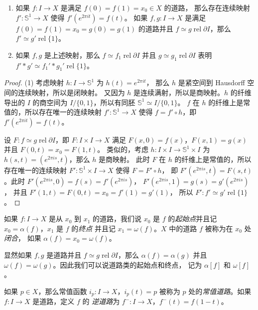 \documentclass[fontset=none]{Notes}
\DeclareMathOperator\rel{rel}
\newcommand{\partI}{\partial I}
\newcommand{\relhomo}{\rel\partI}
\begin{document}
\begin{problem}{}{}
  \begin{enumerate}
    \item 如果 $f:I\to X$ 是满足 $f(0)=f(1)=x_0\in X$ 的道路，
    那么存在连续映射 $f':\mathbb{S}^1\to X$ 使得 $f'(e^{2\pi it})=f(t)$。
    如果 $f,g:I\to X$ 是满足 $f(0)=f(1)=x_0=g(0)=g(1)$ 的道路并且
    $f\simeq g\relhomo$，那么 $f'\simeq g'\rel\{1\}$。
    \item 如果 $f,g$ 是上述映射，那么 $f\simeq f_1\relhomo$
    并且 $g\simeq g_1\relhomo$ 表明 $f'*g'\simeq f_1'*g_1'\rel\{1\}$。
  \end{enumerate}
\end{problem}
\begin{proof}
  (1) 考虑映射 $h:I\to \mathbb{S}^1$ 为 $h(t)=e^{2\pi it}$，
  那么 $h$ 是紧空间到 Hausdorff 空间的连续映射，所以是闭映射。
  又因为 $h$ 是连续满射，所以是商映射。$h$ 的纤维导出的 $I$
  的商空间为 $I/\{0,1\}$，所以有同胚 $\mathbb{S}^1\simeq I/\{0,1\}$。
  $f$ 在 $h$ 的纤维上是常值的，所以存在唯一的连续映射 $f':\mathbb{S}^1\to X$
  使得 $f=f'\circ h$，即 $f'(e^{2\pi i t})=f(t)$。

  设 $F:f\simeq g\relhomo$，即 $F:I\times I\to X$ 满足
  $F(x,0)=f(x)$，$F(x,1)=g(x)$ 并且 $F(0,t)=x_0=F(1,t)$。
  类似的，考虑 $h:I\times I\to \mathbb{S}^1\times I$ 为
  $h(s,t)=(e^{2\pi i s},t)$，那么 $h$ 是商映射。
  此时 $F$ 在 $h$ 的纤维上是常值的，所以存在唯一的连续映射
  $F':\mathbb{S}^1\times I\to X$ 使得 $F=F'\circ h$，
  即 $F'(e^{2\pi i s},t)=F(s,t)$。此时
  $F'(e^{2\pi is},0)=f(s)=f'(e^{2\pi i s})$，
  $F'(e^{2\pi is},1)=g(s)=g'(e^{2\pi i s})$，
  并且 $F'(1,t)=F(0,t)=x_0=f'(1)=g'(1)$，
  所以 $F':f'\simeq g'\rel\{1\}$。
\end{proof}

\begin{definition}
  如果 $f:I\to X$ 是从 $x_0$ 到 $x_1$ 的道路，我们说 $x_0$ 是 $f$
  的\emph{起始点}并且记 $x_0=\alpha(f)$，$x_1$ 是 $f$ 的\emph{终点}
  并且记 $x_1=\omega(f)$。$X$ 中的道路 $f$ 被称为在 $x_0$ 处\emph{闭合}，
  如果 $\alpha(f)=x_0=\omega(f)$。
\end{definition}

显然如果 $f,g$ 是道路并且 $f\simeq g\relhomo$，那么 $\alpha(f)=\alpha(g)$
并且 $\omega(f)=\omega(g)$。因此我们可以说道路类的起始点和终点，
记为 $\alpha[f]$ 和 $\omega[f]$。

\begin{definition}
  如果 $p\in X$，那么常值函数 $i_p:I\to X$，$i_p(t)=p$ 被称为
  $p$ 处的\emph{常值道路}。如果 $f:I\to X$ 是道路，定义 $f$ 的
  \emph{逆道路}为 $f^-:I\to X$，$f^-(t)=f(1-t)$。
\end{definition}
\end{document}
